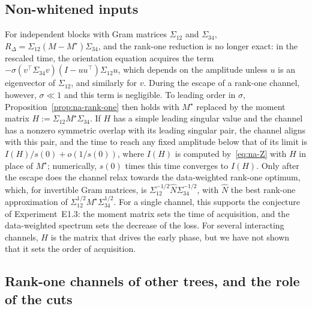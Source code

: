 \documentclass[11pt]{article}
\theoremstyle{definition}
\numberwithin{equation}{section}
\begin{document}
\subsection{Non-whitened inputs}\label{sec:na-nonwhite}

For independent blocks with Gram matrices $\Sigma_{12}$ and $\Sigma_{34}$, $R_\Delta=\Sigma_{12}(M-M^\star)\Sigma_{34}$, and the rank-one reduction is no longer exact: in the rescaled time, the orientation equation acquires the term $-\sigma(v^\top\Sigma_{34}v)(I-uu^\top)\Sigma_{12}u$, which depends on the amplitude unless $u$ is an eigenvector of $\Sigma_{12}$, and similarly for $v$. During the escape of a rank-one channel, however, $\sigma\ll1$ and this term is negligible. To leading order in $\sigma$, Proposition~\ref{prop:na-rank-one} then holds with $M^\star$ replaced by the moment matrix $H:=\Sigma_{12}M^\star\Sigma_{34}$. If $H$ has a simple leading singular value and the channel has a nonzero symmetric overlap with its leading singular pair, the channel aligns with this pair, and the time to reach any fixed amplitude below that of its limit is $I(H)/s(0)+o(1/s(0))$, where $I(H)$ is computed by~\eqref{eq:na-Z} with $H$ in place of $M^\star$; numerically, $s(0)$ times this time converges to $I(H)$. Only after the escape does the channel relax towards the data-weighted rank-one optimum, which, for invertible Gram matrices, is $\Sigma_{12}^{-1/2}\hat N\Sigma_{34}^{-1/2}$, with $\hat N$ the best rank-one approximation of $\Sigma_{12}^{1/2}M^\star\Sigma_{34}^{1/2}$. For a single channel, this supports the conjecture of Experiment~E1.3: the moment matrix sets the time of acquisition, and the data-weighted spectrum sets the decrease of the loss. For several interacting channels, $H$ is the matrix that drives the early phase, but we have not shown that it sets the order of acquisition.

\subsection{Rank-one channels of other trees, and the role of the cuts}\label{sec:na-trees}
\end{document}
